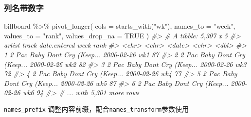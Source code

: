 \documentclass[
]{book}
\newenvironment{Shaded}{\begin{snugshade}}{\end{snugshade}}
\newcommand{\AttributeTok}[1]{\textcolor[rgb]{0.77,0.63,0.00}{#1}}
\newcommand{\CommentTok}[1]{\textcolor[rgb]{0.56,0.35,0.01}{\textit{#1}}}
\newcommand{\ConstantTok}[1]{\textcolor[rgb]{0.00,0.00,0.00}{#1}}
\newcommand{\FunctionTok}[1]{\textcolor[rgb]{0.00,0.00,0.00}{#1}}
\newcommand{\NormalTok}[1]{#1}
\newcommand{\SpecialCharTok}[1]{\textcolor[rgb]{0.00,0.00,0.00}{#1}}
\newcommand{\StringTok}[1]{\textcolor[rgb]{0.31,0.60,0.02}{#1}}
\begin{document}
\hypertarget{ux5217ux540dux5e26ux6570ux5b57}{%
\subsubsection{列名带数字}\label{ux5217ux540dux5e26ux6570ux5b57}}

\begin{Shaded}
\begin{Highlighting}[]
\NormalTok{billboard }\SpecialCharTok{\%\textgreater{}\%} 
  \FunctionTok{pivot\_longer}\NormalTok{(}
    \AttributeTok{cols =} \FunctionTok{starts\_with}\NormalTok{(}\StringTok{"wk"}\NormalTok{), }
    \AttributeTok{names\_to =} \StringTok{"week"}\NormalTok{, }
    \AttributeTok{values\_to =} \StringTok{"rank"}\NormalTok{,}
    \AttributeTok{values\_drop\_na =} \ConstantTok{TRUE}
\NormalTok{  )}
\CommentTok{\#\textgreater{} \# A tibble: 5,307 x 5}
\CommentTok{\#\textgreater{}   artist track                   date.entered week   rank}
\CommentTok{\#\textgreater{}   \textless{}chr\textgreater{}  \textless{}chr\textgreater{}                   \textless{}date\textgreater{}       \textless{}chr\textgreater{} \textless{}dbl\textgreater{}}
\CommentTok{\#\textgreater{} 1 2 Pac  Baby Don\textquotesingle{}t Cry (Keep... 2000{-}02{-}26   wk1      87}
\CommentTok{\#\textgreater{} 2 2 Pac  Baby Don\textquotesingle{}t Cry (Keep... 2000{-}02{-}26   wk2      82}
\CommentTok{\#\textgreater{} 3 2 Pac  Baby Don\textquotesingle{}t Cry (Keep... 2000{-}02{-}26   wk3      72}
\CommentTok{\#\textgreater{} 4 2 Pac  Baby Don\textquotesingle{}t Cry (Keep... 2000{-}02{-}26   wk4      77}
\CommentTok{\#\textgreater{} 5 2 Pac  Baby Don\textquotesingle{}t Cry (Keep... 2000{-}02{-}26   wk5      87}
\CommentTok{\#\textgreater{} 6 2 Pac  Baby Don\textquotesingle{}t Cry (Keep... 2000{-}02{-}26   wk6      94}
\CommentTok{\#\textgreater{} \# ... with 5,301 more rows}
\end{Highlighting}
\end{Shaded}

\texttt{names\_prefix} 调整内容前缀，配合\texttt{names\_transform}参数使用
\end{document}
